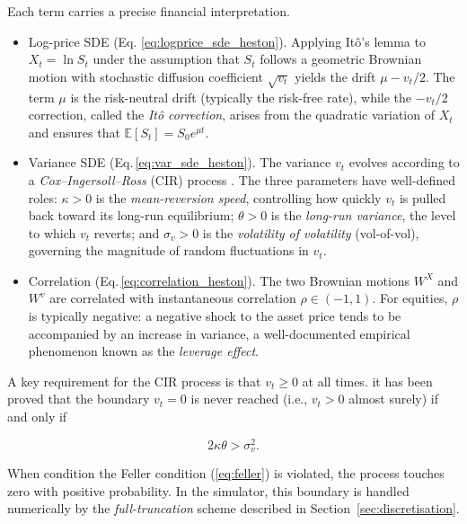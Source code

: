 Each term carries a precise financial interpretation.
\begin{itemize}
    \item Log-price SDE (Eq. \ref{eq:logprice_sde_heston}). Applying It\^{o}'s lemma to $X_t = \ln S_t$ under the assumption that $S_t$ follows a geometric Brownian motion with stochastic diffusion coefficient $\sqrt{v_t}$ yields the drift $\mu - v_t/2$. The term $\mu$ is the risk-neutral drift (typically the risk-free rate), while the $-v_t/2$ correction, 
    called the \textit{It\^{o} correction}, arises from the quadratic variation of $X_t$ and ensures that $\mathbb{E}[S_t] = S_0 e^{\mu t}$.
    \item Variance SDE (Eq.\,\ref{eq:var_sde_heston}). The variance $v_t$ evolves according to a \textit{Cox--Ingersoll--Ross} (CIR) process \cite{heston:cir_process}.
     The three parameters have well-defined roles: $\kappa > 0$ is the \textit{mean-reversion speed}, 
     controlling how quickly $v_t$ is pulled back toward its long-run equilibrium; $\theta > 0$ is
      the \textit{long-run variance}, the level to which $v_t$ reverts; and $\sigma_v > 0$ is the \textit{volatility of volatility} (vol-of-vol), 
      governing the magnitude of random fluctuations in $v_t$.
      \item Correlation (Eq.\,\ref{eq:correlation_heston}). The two Brownian motions $W^X$ and $W^v$ are correlated with instantaneous correlation $\rho \in (-1, 1)$. For equities, $\rho$ is typically negative: a negative shock to the asset price tends to be accompanied by an increase in variance, a well-documented empirical phenomenon known as the \textit{leverage effect}.
\end{itemize}

A key requirement for the CIR process is that $v_t \geq 0$ at all times. it has been proved that the boundary $v_t = 0$ is never reached (i.e., $v_t > 0$ almost surely) if and only if

\begin{equation}
    2\kappa\theta > \sigma_v^2.
    \label{eq:feller}
\end{equation}

When condition the Feller condition (\ref{eq:feller}) is violated, the process touches zero with positive probability. In the simulator, this boundary is handled numerically by the \textit{full-truncation} scheme described in Section~\ref{sec:discretisation}.\\


